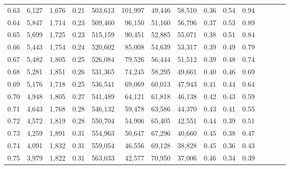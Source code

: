 \begin{tabular}{rrrcrrrrrrrrrrr}
0.63 &  6,127 &  1,676 &                                       0.21 &  503,613 &  101,997 &   49,446 &   58,510 &  0.36 &  0.54 &                         0.94 \\
0.64 &  5,847 &  1,714 &                                       0.23 &  509,460 &   96,150 &   51,160 &   56,796 &  0.37 &  0.53 &                         0.89 \\
0.65 &  5,699 &  1,725 &                                       0.23 &  515,159 &   90,451 &   52,885 &   55,071 &  0.38 &  0.51 &                         0.84 \\
0.66 &  5,443 &  1,754 &                                       0.24 &  520,602 &   85,008 &   54,639 &   53,317 &  0.39 &  0.49 &                         0.79 \\
0.67 &  5,482 &  1,805 &                                       0.25 &  526,084 &   79,526 &   56,444 &   51,512 &  0.39 &  0.48 &                         0.74 \\
0.68 &  5,281 &  1,851 &                                       0.26 &  531,365 &   74,245 &   58,295 &   49,661 &  0.40 &  0.46 &                         0.69 \\
0.69 &  5,176 &  1,718 &                                       0.25 &  536,541 &   69,069 &   60,013 &   47,943 &  0.41 &  0.44 &                         0.64 \\
0.70 &  4,948 &  1,805 &                                       0.27 &  541,489 &   64,121 &   61,818 &   46,138 &  0.42 &  0.43 &                         0.59 \\
0.71 &  4,643 &  1,768 &                                       0.28 &  546,132 &   59,478 &   63,586 &   44,370 &  0.43 &  0.41 &                         0.55 \\
0.72 &  4,572 &  1,819 &                                       0.28 &  550,704 &   54,906 &   65,405 &   42,551 &  0.44 &  0.39 &                         0.51 \\
0.73 &  4,259 &  1,891 &                                       0.31 &  554,963 &   50,647 &   67,296 &   40,660 &  0.45 &  0.38 &                         0.47 \\
0.74 &  4,091 &  1,832 &                                       0.31 &  559,054 &   46,556 &   69,128 &   38,828 &  0.45 &  0.36 &                         0.43 \\
0.75 &  3,979 &  1,822 &                                       0.31 &  563,033 &   42,577 &   70,950 &   37,006 &  0.46 &  0.34 &                         0.39 \\

\end{tabular}
